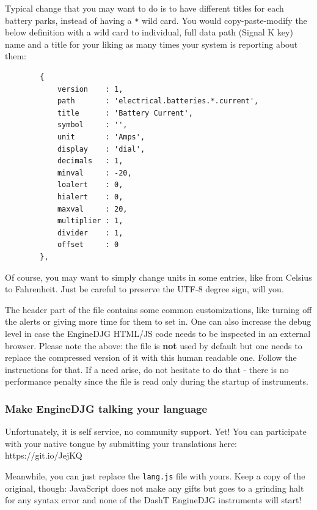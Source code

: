 \documentclass[11pt]{article}
\begin{document}
    Typical change that you may want to do is to have different titles for
each battery parks, instead of having a \texttt{*} wild card. You would
copy-paste-modify the below definition with a wild card to individual,
full data path (Signal K key) name and a title for your liking as many
times your system is reporting about them:

    \begin{verbatim}
        {
            version    : 1,
            path       : 'electrical.batteries.*.current',
            title      : 'Battery Current',
            symbol     : '',
            unit       : 'Amps',
            display    : 'dial',
            decimals   : 1,
            minval     : -20,
            loalert    : 0,
            hialert    : 0,
            maxval     : 20,
            multiplier : 1,
            divider    : 1,
            offset     : 0
        },
\end{verbatim}

    Of course, you may want to simply change units in some entries, like
from Celsius to Fahrenheit. Just be careful to preserve the UTF-8 degree
sign, will you.

    The header part of the file contains some common customizations, like
turning off the alerts or giving more time for them to set in. One can
also increase the debug level in case the EngineDJG HTML/JS code needs
to be inspected in an external browser. Please note the above: the file
is \textbf{not} used by default but one needs to replace the compressed
version of it with this human readable one. Follow the instructions for
that. If a need arise, do not hesitate to do that - there is no
performance penalty since the file is read only during the startup of
instruments.

    \hypertarget{make-enginedjg-talking-your-language}{%
\subsubsection{Make EngineDJG talking your
language}\label{make-enginedjg-talking-your-language}}

    Unfortunately, it is self service, no community support. Yet! You can
participate with your native tongue by submitting your translations
here: https://git.io/JejKQ

    Meanwhile, you can just replace the \texttt{lang.js} file with yours.
Keep a copy of the original, though: JavaScript does not make any gifts
but goes to a grinding halt for any syntax error and none of the DashT
EngineDJG instruments will start!
\end{document}
